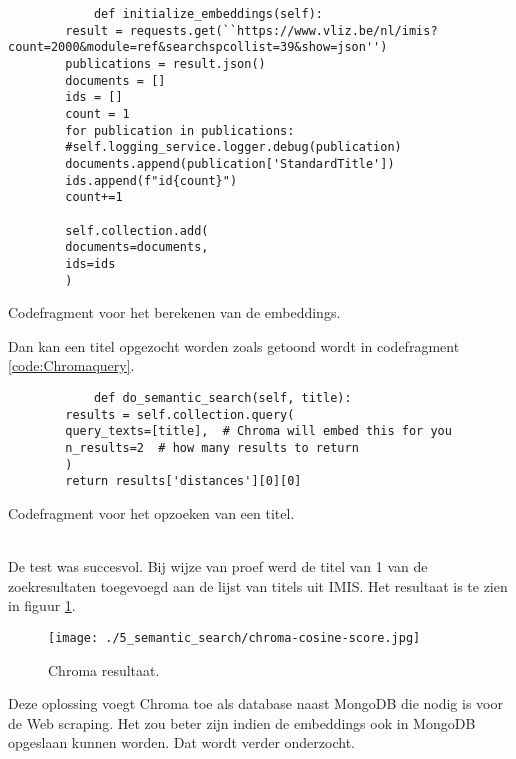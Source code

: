 \begin{listing}
    \begin{verbatim}
            def initialize_embeddings(self):
        result = requests.get(``https://www.vliz.be/nl/imis?count=2000&module=ref&searchspcollist=39&show=json'')
        publications = result.json()
        documents = []
        ids = []
        count = 1
        for publication in publications:
        #self.logging_service.logger.debug(publication)
        documents.append(publication['StandardTitle'])
        ids.append(f"id{count}")
        count+=1
        
        self.collection.add(
        documents=documents,
        ids=ids
        )
    \end{verbatim}
    \caption[Embeddings codefragment]{Codefragment voor het berekenen van de embeddings.}
    \label{code:Chromaembeddings}
\end{listing}
Dan kan een titel opgezocht worden zoals getoond wordt in codefragment \ref{code:Chromaquery}.
\begin{listing}
    \begin{verbatim}
            def do_semantic_search(self, title):
        results = self.collection.query(
        query_texts=[title],  # Chroma will embed this for you
        n_results=2  # how many results to return
        )
        return results['distances'][0][0]
    \end{verbatim}
    \caption[Query codefragment]{Codefragment voor het opzoeken van een titel.}
    \label{code:Chromaquery}
\end{listing}
\\
De test was succesvol. Bij wijze van proef werd de titel van 1 van de zoekresultaten toegevoegd aan de lijst van titels uit IMIS. Het resultaat is te zien in figuur \ref{fig:Chroma}.
\begin{figure}
    \centering
    \texttt{[image: ./5\_semantic\_search/chroma-cosine-score.jpg]}
    \caption[Chroma resultaat.]{\label{fig:Chroma}Chroma resultaat.}
\end{figure}
Deze oplossing voegt Chroma toe als database naast MongoDB die nodig is voor de Web scraping. Het zou beter zijn indien de embeddings ook in MongoDB opgeslaan kunnen worden. Dat wordt verder onderzocht.
